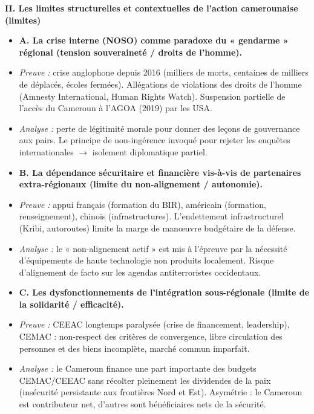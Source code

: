 \documentclass[11pt]{article}
\begin{document}
\begin{exoresolu}
\textbf{II. Les limites structurelles et contextuelles de l'action camerounaise (limites)}
\begin{itemize}
    \item \textbf{A. La crise interne (NOSO) comme paradoxe du « gendarme » régional (tension souveraineté / droits de l'homme).}
    \item \emph{Preuve :} crise anglophone depuis 2016 (milliers de morts, centaines de milliers de déplacés, écoles fermées). Allégations de violations des droits de l'homme (Amnesty International, Human Rights Watch). Suspension partielle de l'accès du Cameroun à l'AGOA (2019) par les USA.
    \item \emph{Analyse :} perte de légitimité morale pour donner des leçons de gouvernance aux pairs. Le principe de non-ingérence invoqué pour rejeter les enquêtes internationales $\rightarrow$ isolement diplomatique partiel.
    \item \textbf{B. La dépendance sécuritaire et financière vis-à-vis de partenaires extra-régionaux (limite du non-alignement / autonomie).}
    \item \emph{Preuve :} appui français (formation du BIR), américain (formation, renseignement), chinois (infrastructures). L'endettement infrastructurel (Kribi, autoroutes) limite la marge de manœuvre budgétaire de la défense.
    \item \emph{Analyse :} le « non-alignement actif » est mis à l'épreuve par la nécessité d'équipements de haute technologie non produits localement. Risque d'alignement de facto sur les agendas antiterroristes occidentaux.
    \item \textbf{C. Les dysfonctionnements de l'intégration sous-régionale (limite de la solidarité / efficacité).}
    \item \emph{Preuve :} CEEAC longtemps paralysée (crise de financement, leadership), CEMAC : non-respect des critères de convergence, libre circulation des personnes et des biens incomplète, marché commun imparfait.
    \item \emph{Analyse :} le Cameroun finance une part importante des budgets CEMAC/CEEAC sans récolter pleinement les dividendes de la paix (insécurité persistante aux frontières Nord et Est). Asymétrie : le Cameroun est contributeur net, d'autres sont bénéficiaires nets de la sécurité.
\end{itemize}


\end{exoresolu}
\end{document}
